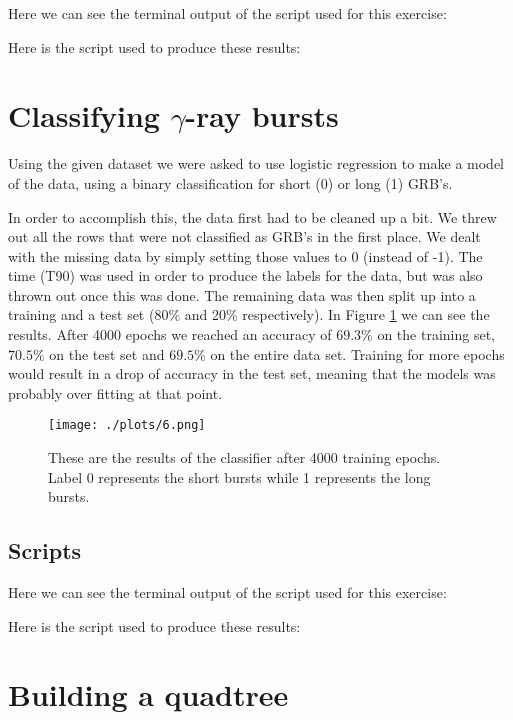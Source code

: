 \documentclass[a4paper,10pt]{article}
\begin{document}
Here we can see the terminal output of the script used for this exercise:


Here is the script used to produce these results: 


\section{Classifying $\gamma$-ray bursts}

Using the given dataset we were asked to use logistic regression to make a model of the data, using a binary classification for short (0) or long (1) GRB's. 

In order to accomplish this, the data first had to be cleaned up a bit. We threw out all the rows that were not classified as GRB's in the first place. We dealt with the missing data by simply setting those values to 0 (instead of -1). The time (T90) was used in order to produce the labels for the data, but was also thrown out once this was done. The remaining data was then split up into a training and a test set (80\% and 20\% respectively). In Figure \ref{fig:6} we can see the results. After 4000 epochs we reached an accuracy of $69.3\%$ on the training set, $70.5\%$ on the test set and $69.5\%$ on the entire data set. Training for more epochs would result in a drop of accuracy in the test set, meaning that the models was probably over fitting at that point.  

\begin{figure}[h!]
  \centering
  \texttt{[image: ./plots/6.png]}
  \caption{These are the results of the classifier after 4000 training epochs. Label 0 represents the short bursts while 1 represents the long bursts.}
  \label{fig:6}
\end{figure}

\subsection{Scripts}

Here we can see the terminal output of the script used for this exercise:


Here is the script used to produce these results: 


\section{Building a quadtree}
\end{document}
